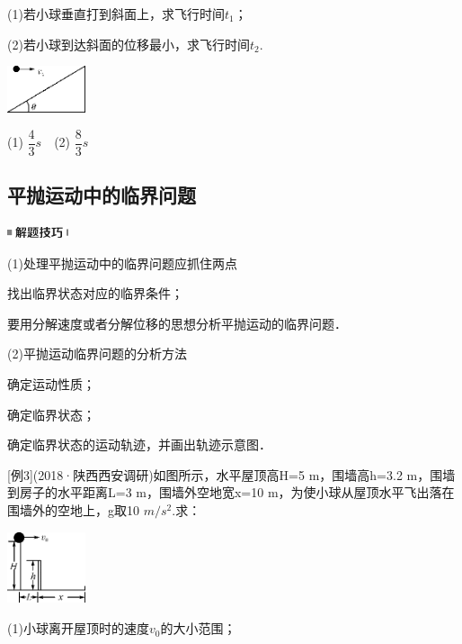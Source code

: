 (1)若小球垂直打到斜面上，求飞行时间$t_1$；

(2)若小球到达斜面的位移最小，求飞行时间$t_2$.

\begin{center}\includegraphics[width=0.90625in,height=0.54167in]{media/image166.png}\end{center}
\begin{solution}
	(1) $\dfrac{4}{3}s$　(2) $\dfrac{8}{3}s$
\end{solution}
\newpage
\subsection{平抛运动中的临界问题}

\begin{center}\includegraphics[width=0.70833in,height=0.125in]{media/image37.png}\end{center}

(1)处理平抛运动中的临界问题应抓住两点

找出临界状态对应的临界条件；

要用分解速度或者分解位移的思想分析平抛运动的临界问题．

(2)平抛运动临界问题的分析方法

确定运动性质；

确定临界状态；

确定临界状态的运动轨迹，并画出轨迹示意图．

{[}例3{]}(2018·陕西西安调研)如图所示，水平屋顶高H=5 m，围墙高h=3.2
m，围墙到房子的水平距离L=3 m，围墙外空地宽x=10
m，为使小球从屋顶水平飞出落在围墙外的空地上，g取10 $m/s^2$.求：

\begin{center}\includegraphics[width=0.90625in,height=0.82292in]{media/image169.png}\end{center}

(1)小球离开屋顶时的速度$v_0$的大小范围；

